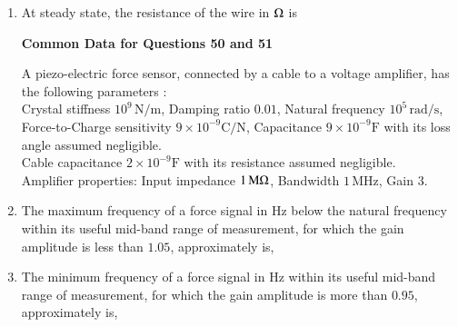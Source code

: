 \documentclass[journal,12pt,onecolumn]{IEEEtran}
\theoremstyle{remark}
\begin{document}
\begin{enumerate}
\item At steady state, the resistance of the wire in $\ohm$ is  
\par \hfill{}
\begin{enumerate}
\end{enumerate}

\textbf{Common Data for Questions 50 and 51}

A piezo-electric force sensor, connected by a cable to a voltage amplifier, has the following parameters :\\
Crystal stiffness $10^9\,\text{N/m}$, Damping ratio $0.01$, Natural frequency $10^5\,\text{rad/s}$, Force-to-Charge sensitivity $9 \times 10^{-9} \text{C/N}$, Capacitance $9 \times 10^{-9} \text{F}$ with its loss angle assumed negligible. \\
Cable capacitance $2 \times 10^{-9} \text{F}$ with its resistance assumed negligible.\\
Amplifier properties: Input impedance $1\,\text{M}\ohm$, Bandwidth $1\,\text{MHz}$, Gain $3$.

\item The maximum frequency of a force signal in Hz below the natural frequency within its useful mid-band range of measurement, for which the gain amplitude is less than $1.05$, approximately is,  
\par \hfill{}
\begin{enumerate}
\end{enumerate}

\item The minimum frequency of a force signal in Hz within its useful mid-band range of measurement, for which the gain amplitude is more than $0.95$, approximately is,  
\par \hfill{}
\begin{enumerate}
\end{enumerate}


\end{enumerate}
\end{document}
